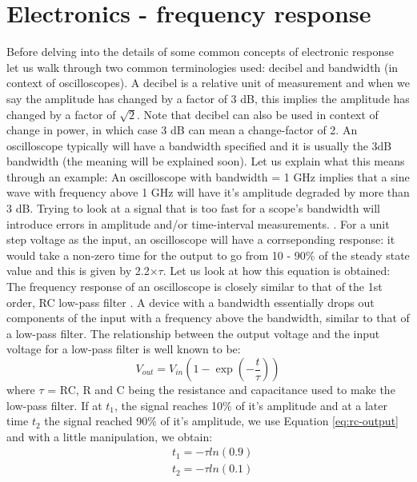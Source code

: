 \documentclass[11pt]{article}
\begin{document}
\newpage
\appendix
\section{Electronics - frequency response}\label{app:electronic-response}
Before delving into the details of some common concepts of electronic response let us walk through two common terminologies used: decibel and bandwidth (in context of oscilloscopes). 
\newline A decibel is a relative unit of measurement and when we say the amplitude has changed by a factor of 3 dB, this implies the amplitude has changed by a factor of $\sqrt{2}$. Note that decibel can also be used in context of change in power, in which case 3 dB can mean a change-factor of 2.
\newline An oscilloscope typically will have a bandwidth specified and it is usually the 3dB bandwidth (the meaning will be explained soon). Let us explain what this means through an example: An oscilloscope with bandwidth = 1 GHz implies that a sine wave with frequency above 1 GHz will have it's amplitude degraded by more than 3 dB. Trying to look at a signal that is too fast for a scope's bandwidth will introduce errors in amplitude and/or time-interval measurements. \cite{hp-catalog-oscilloscopes}.
\newline For a unit step voltage as the input, an oscilloscope will have a corrseponding response: it would take a non-zero time for the output to go from 10 - 90\% of the steady state value and this is given by 2.2$\times\tau$. Let us look at how this equation is obtained:
\newline The frequency response of an oscilloscope is closely similar to that of the 1st order, RC low-pass filter \cite{thorLabs-BW-risetime}. A device with a bandwidth essentially drops out components of the input with a frequency above the bandwidth, similar to that of a low-pass filter. The relationship between the output voltage and the input voltage for a low-pass filter is well known to be:
\begin{equation}\label{eq:rc-output}
    V_{out} = V_{in}\left(1 - \exp(-\frac{t}{\tau})\right)
\end{equation}
where $\tau$ = RC, R and C being the resistance and capacitance used to make the low-pass filter. If at $t_1$, the signal reaches 10\% of it's amplitude and at a later time $t_2$ the signal reached 90\% of it's amplitude, we use Equation \ref{eq:rc-output} and with a little manipulation, we obtain:
$$
\begin{aligned}
&t_1 = -\tau ln(0.9)\\
&t_2 = -\tau ln(0.1)
\end{aligned}
$$
\end{document}
